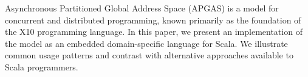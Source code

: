 Asynchronous Partitioned Global Address Space (APGAS) is a model for concurrent
and distributed programming, known primarily as the foundation of the X10
programming language. In this paper, we present an implementation of the model
as an embedded domain-specific language for Scala. We illustrate common usage
patterns and contrast with alternative approaches available to Scala
programmers.
